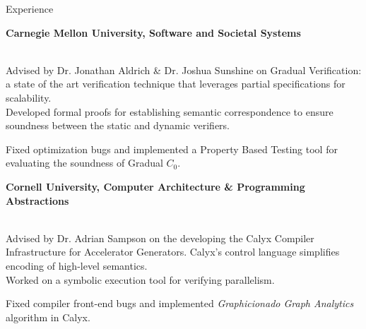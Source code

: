 \begin{rSection}{Experience}
	{\textbf{\large{Carnegie Mellon University, Software and Societal Systems}} \hfill \color{darkgray}{06/2022 - Present} 
	\\ \vspace*{2mm}
	\\ 
	\color{black}
	\begin{minipage}{40em}
		Advised by Dr. Jonathan Aldrich \& Dr. Joshua Sunshine on Gradual Verification: a state of the art verification technique that leverages partial specifications for scalability. \\
		\color{black}Developed formal proofs for establishing semantic correspondence to ensure soundness between the static and dynamic verifiers.

		\color{black}Fixed optimization bugs and implemented a Property Based Testing tool for evaluating the soundness of Gradual $C_0$.
	\end{minipage}}
	
	\vspace*{2mm}

	{\textbf{\large{Cornell University, Computer Architecture \& Programming Abstractions}} \hfill \color{darkgray}{10/2021 - 12/2022} 
	\\ \vspace*{2mm}
	\\
	\color{black}
	\begin{minipage}{40em}
		Advised by Dr. Adrian Sampson on the developing the Calyx Compiler Infrastructure for Accelerator Generators. Calyx's control language simplifies encoding of high-level semantics. \\
		\color{black} Worked on a symbolic execution tool for verifying parallelism.

		\color{black} Fixed compiler front-end bugs and implemented \textit{Graphicionado Graph Analytics} algorithm in Calyx.
	\end{minipage}} 

	\vspace*{2mm}

\end{rSection} 
